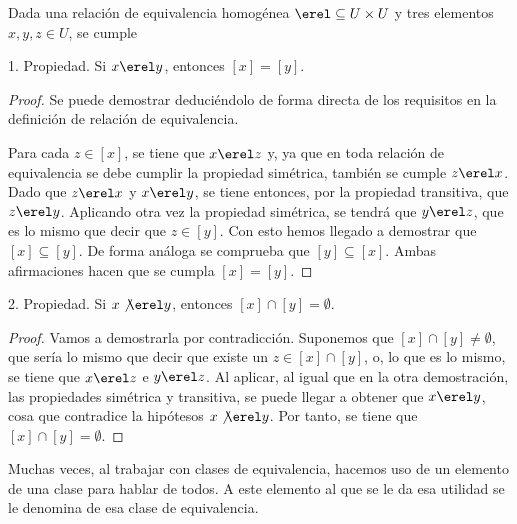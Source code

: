 Dada una relación de equivalencia homogénea $\erel \subseteq U \times U$ y
tres elementos $x, y, z \in U$, se cumple

\begin{proposition}
  1. Propiedad. Si $x \erel y$, entonces $[x] = [y]$.
\end{proposition}

\begin{proof}
  Se puede demostrar deduciéndolo de forma directa de los requisitos en la
  definición de relación de equivalencia.

  Para cada $z \in [x]$, se tiene que $x \erel z$ y, ya que en toda relación
  de equivalencia se debe cumplir la propiedad simétrica, también se cumple
  $z \erel x$. Dado que $z \erel x$ y $x \erel y$, se tiene entonces, por la
  propiedad transitiva, que $z \erel y$. Aplicando otra vez la propiedad
  simétrica, se tendrá que $y \erel z$, que es lo mismo que decir que $z \in
  [y]$. Con esto hemos llegado a demostrar que $[x] \subseteq [y]$. De forma
  análoga se comprueba que $[y] \subseteq [x]$. Ambas afirmaciones hacen que
  se cumpla $[x] = [y]$.
\end{proof}

\begin{proposition}
  2. Propiedad. Si $x \not\erel y$, entonces $[x] \cap [y] = \emptyset$.
\end{proposition}

\begin{proof}
  Vamos a demostrarla por contradicción. Suponemos que $[x] \cap [y] \neq
  \emptyset$, que sería lo mismo que decir que existe un $z \in [x] \cap
  [y]$, o, lo que es lo mismo, se tiene que $x \erel z$ e $y \erel z$. Al
  aplicar, al igual que en la otra demostración, las propiedades simétrica y
  transitiva, se puede llegar a obtener que $x \erel y$, cosa que contradice
  la hipótesos $x \not \erel y$. Por tanto, se tiene que $[x] \cap [y] =
  \emptyset$.
\end{proof}

Muchas veces, al trabajar con clases de equivalencia, hacemos uso de un
elemento de una clase para hablar de todos. A este elemento al que se le da
esa utilidad se le denomina  de esa clase de
equivalencia.

